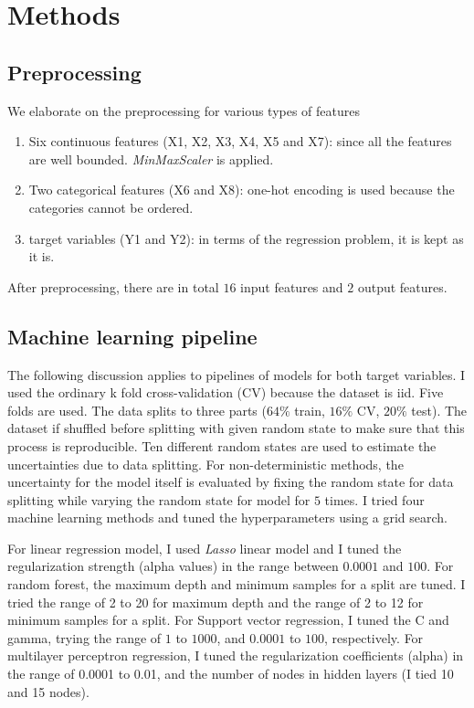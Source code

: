 \documentclass{article}
\begin{document}
\section{Methods \label{sec:methods}}
\subsection{Preprocessing}
We elaborate on the preprocessing for various types of features

\begin{enumerate}
	\item[\bullet] Six continuous features (X1, X2, X3, X4, X5 and X7): since all the features are well bounded. \textit{MinMaxScaler} is applied. 

	\item[\bullet] Two categorical features (X6 and X8): one-hot encoding is used because the categories cannot be ordered.

	\item[\bullet] target variables (Y1 and Y2): in terms of the regression problem, it is kept as it is. 
\end{enumerate}
After preprocessing, there are in total $16$ input features and $2$ output features.

\subsection{Machine learning pipeline}
The following discussion applies to pipelines of models for both target variables. I used the ordinary k fold cross-validation (CV) because the dataset is iid.
Five folds are used. The data splits to three parts ($64\%$ train, $16\%$ CV, $20\%$ test). The dataset if shuffled before splitting with given random state to make sure that this process is reproducible. Ten different random states  are used to estimate the uncertainties  due to data splitting. For non-deterministic methods, the uncertainty for the model itself is evaluated by fixing the random state for data splitting while varying the random state for model for $5$ times. I tried four machine learning methods and tuned the hyperparameters using a grid search.

For linear regression model, I used \textit{Lasso} linear model and I tuned the regularization strength (alpha values) in the range between $0.0001$ and $100$.
For random forest, the maximum depth and minimum samples for a split are tuned. I tried the range of 2 to 20 for maximum depth and the range of 2 to 12 for minimum samples for a split. 
For Support vector regression, I tuned the C and gamma, trying the range of 
$1$ to $1000$, and $0.0001$ to $100$, respectively. 
For multilayer perceptron regression, I tuned the regularization coefficients (alpha) in the range of 0.0001 to 0.01, and the number of nodes in hidden layers (I tied 10 and 15 nodes). 
\end{document}
